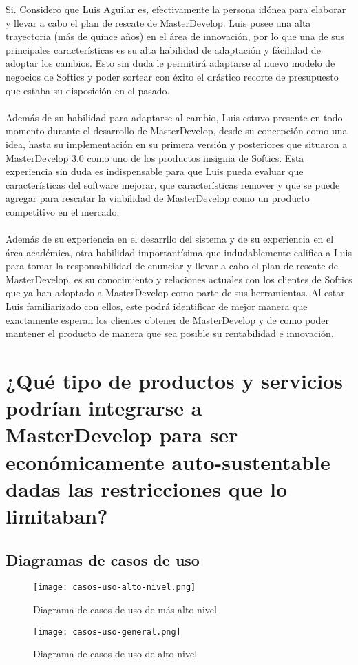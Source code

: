 \documentclass{article}
\begin{document}
	Si. Considero que Luis Aguilar es, efectivamente la persona
	idónea para elaborar y llevar a cabo el plan de rescate
	de MasterDevelop. Luis posee una alta trayectoria (más de
	quince años) en el área de innovación, por lo que una
	de sus principales características es su alta habilidad de
	adaptación y fácilidad de adoptar los cambios. Esto sin duda
	le permitirá adaptarse al nuevo modelo de negocios de 
	Softics y poder sortear con éxito el drástico recorte de 
	presupuesto que estaba su disposición en el pasado.
	\\\\
	Además de su habilidad para adaptarse al cambio, Luis
	estuvo presente en todo momento durante el desarrollo de
	MasterDevelop, desde su concepción como una idea, hasta
	su implementación en su primera versión y posteriores que
	situaron a MasterDevelop 3.0 como uno de los productos
	insignia de Softics. Esta experiencia sin duda es 
	indispensable para que Luis pueda evaluar que características
	del software mejorar, que características remover y que 
	se puede agregar para rescatar la viabilidad de 
	MasterDevelop como un producto competitivo en el mercado.
	\\\\
	Además de su experiencia en el desarrllo del sistema y 
	de su experiencia en el área académica, otra habilidad
	importantísima que indudablemente califica a Luis para
	tomar la responsabilidad de enunciar y llevar a cabo el 
	plan de rescate de MasterDevelop, es su conocimiento y 
	relaciones actuales con los clientes de Softics que ya han 
	adoptado a MasterDevelop como parte de sus herramientas. 
	Al estar Luis familiarizado con ellos, este podrá identificar
	de mejor manera que exactamente esperan los clientes obtener
	de MasterDevelop y de como poder mantener el producto de
	manera que sea posible su rentabilidad e innovación.

\section{¿Qué tipo de productos y servicios podrían 
integrarse a MasterDevelop para ser económicamente 
auto-sustentable dadas las restricciones que lo limitaban?}

\subsection{Diagramas de casos de uso}
\begin{figure}[ht]
	\centering
        \texttt{[image: casos-uso-alto-nivel.png]}
                 \caption{Diagrama de casos de uso de más alto nivel}
\end{figure}	
\clearpage
\begin{figure}[ht]
        \texttt{[image: casos-uso-general.png]}
                 \caption{Diagrama de casos de uso de alto nivel}
\end{figure}	
\end{document}
